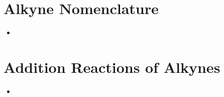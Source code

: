 \clearpage
\section{Alkyne Nomenclature}\label{Alkyne Nomenclature}
\begin{itemize}
    \item 
\end{itemize}

\clearpage
\section{Addition Reactions of Alkynes}\label{Addition Reactions of Alkynes}
\begin{itemize}
    \item 
\end{itemize}